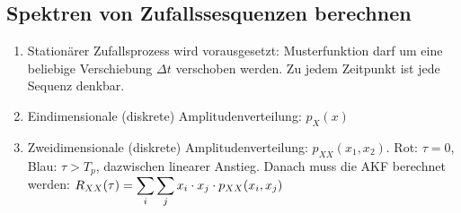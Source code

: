 \documentclass[a4paper]{article}
\begin{document}
\begin{twocolumn}
\newpage
% 

\subsection{Spektren von Zufallssesquenzen berechnen}
\begin{enumerate}
  \item Stationärer Zufallsprozess wird vorausgesetzt: Musterfunktion darf um eine beliebige 
  Verschiebung $\Delta t$ verschoben werden. Zu jedem Zeitpunkt ist jede Sequenz denkbar.
  \item Eindimensionale (diskrete) Amplitudenverteilung: $p_X(x)$
  
  \item Zweidimensionale (diskrete) Amplitudenverteilung: $p_{XX}(x_1, x_2)$. 
  {\color{cRed}Rot}: $\tau = 0$, {\color{cBlue}Blau}: $\tau > T_p$, dazwischen linearer Anstieg. 
  Danach muss die AKF berechnet werden: $\displaystyle R_{XX}(\tau) = \sum_i \sum_j x_i \cdot x_j \cdot p_{XX}(x_i, x_j)$
  

\end{enumerate}
\end{twocolumn}
\end{document}
